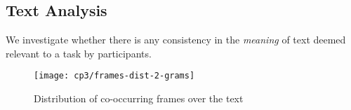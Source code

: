 

\subsection{Text Analysis}
\label{cp3:text-analysis}

We investigate
whether there is any consistency in the \textit{meaning} of
text deemed relevant to a task by participants.











% 


\begin{figure}
\centering
\texttt{[image: cp3/frames-dist-2-grams]}
\caption{Distribution of co-occurring frames over the text}
\label{fig:frame-co-ocurrance}
\end{figure}
    